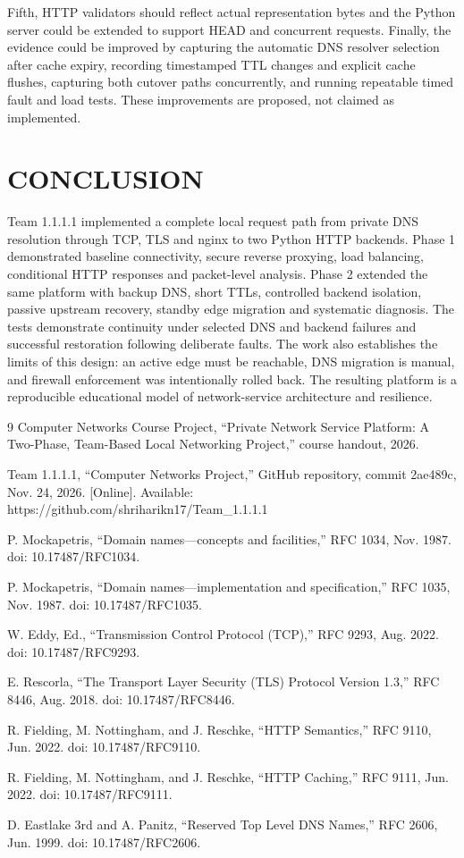 \documentclass[conference]{IEEEtran}
\begin{document}
Fifth, HTTP validators should reflect actual representation bytes and
the Python server could be extended to support HEAD and concurrent
requests. Finally, the evidence could be improved by capturing the
automatic DNS resolver selection after cache expiry, recording
timestamped TTL changes and explicit cache flushes, capturing both
cutover paths concurrently, and running repeatable timed fault and load
tests. These improvements are proposed, not claimed as implemented.

\section{CONCLUSION}\label{viii.-conclusion}

Team 1.1.1.1 implemented a complete local request path from private DNS
resolution through TCP, TLS and nginx to two Python HTTP backends. Phase
1 demonstrated baseline connectivity, secure reverse proxying, load
balancing, conditional HTTP responses and packet-level analysis. Phase 2
extended the same platform with backup DNS, short TTLs, controlled
backend isolation, passive upstream recovery, standby edge migration and
systematic diagnosis. The tests demonstrate continuity under selected
DNS and backend failures and successful restoration following deliberate
faults. The work also establishes the limits of this design: an active
edge must be reachable, DNS migration is manual, and firewall
enforcement was intentionally rolled back. The resulting platform is a
reproducible educational model of network-service architecture and
resilience.

\begin{thebibliography}{9}
 Computer Networks Course Project, ``Private Network Service
Platform: A Two-Phase, Team-Based Local Networking Project,'' course
handout, 2026.

 Team 1.1.1.1, ``Computer Networks Project,'' GitHub repository,
commit 2ae489c, Nov. 24, 2026. {[}Online{]}. Available:
https://github.com/shriharikn17/Team\_1.1.1.1

 P. Mockapetris, ``Domain names---concepts and facilities,'' RFC
1034, Nov. 1987. doi: 10.17487/RFC1034.

 P. Mockapetris, ``Domain names---implementation and
specification,'' RFC 1035, Nov. 1987. doi: 10.17487/RFC1035.

 W. Eddy, Ed., ``Transmission Control Protocol (TCP),'' RFC 9293,
Aug. 2022. doi: 10.17487/RFC9293.

 E. Rescorla, ``The Transport Layer Security (TLS) Protocol
Version 1.3,'' RFC 8446, Aug. 2018. doi: 10.17487/RFC8446.

 R. Fielding, M. Nottingham, and J. Reschke, ``HTTP Semantics,''
RFC 9110, Jun. 2022. doi: 10.17487/RFC9110.

 R. Fielding, M. Nottingham, and J. Reschke, ``HTTP Caching,''
RFC 9111, Jun. 2022. doi: 10.17487/RFC9111.

 D. Eastlake 3rd and A. Panitz, ``Reserved Top Level DNS Names,''
RFC 2606, Jun. 1999. doi: 10.17487/RFC2606.

\end{thebibliography}
\end{document}
